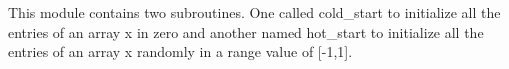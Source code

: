 This module contains two subroutines. One called cold_start to initialize all the entries of an array x in zero and another named hot_start to initialize all the entries of an array x randomly in a range value of [-1,1]. 